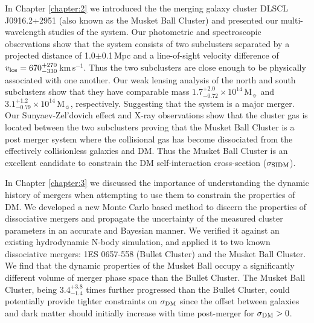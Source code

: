 In Chapter \ref{chapter:2} we introduced the the merging galaxy cluster DLSCL J0916.2+2951 (also known as the Musket Ball Cluster) and presented our multi-wavelength studies of the system.
Our photometric and spectroscopic observations show that the system consists of two subclusters separated by a projected distance of 1.0$\pm$0.1\,Mpc and a line-of-sight velocity difference of $v_{\rm los}=670^{+270}_{-330}$\,km\,s$^{-1}$.
Thus the two subclusters are close enough to be physically associated with one another.
Our weak lensing analysis of the north and south subclusters show that they have comparable mass $1.7^{+2.0}_{-0.72}\times10^{14}$\,M$_\sun$  and $3.1^{+1.2}_{-0.79}\times10^{14}$\,M$_\sun$, respectively.
Suggesting that the system is a major merger.
Our Sunyaev-Zel'dovich effect and X-ray observations show that the cluster gas is located between the two subclusters proving that the Musket Ball Cluster is a post merger system where the collisional gas has become dissociated from the effectively collisionless galaxies and DM.
Thus the Musket Ball Cluster is an excellent candidate to constrain the DM self-interaction cross-section ($\sigma_{\rm SIDM}$).

In Chapter \ref{chapter:3} we discussed the importance of understanding the dynamic history of mergers when attempting to use them to constrain the properties of DM.
We developed a new Monte Carlo based method to discern the properties of dissociative mergers and propagate the uncertainty of the measured cluster parameters in an accurate and Bayesian manner.
We verified it against an existing hydrodynamic N-body simulation, and applied it to two known dissociative mergers: 1ES 0657-558 (Bullet Cluster) and the Musket Ball Cluster.
We find that the dynamic properties of the Musket Ball occupy a significantly different volume of merger phase space than the Bullet Cluster.
The Musket Ball Cluster, being $3.4^{+3.8}_{-1.4}$ times further progressed than the Bullet Cluster, could potentially provide tighter constraints on $\sigma_{\rm DM}$ since the offset between galaxies and dark matter should initially increase with time post-merger for  $\sigma_{\rm DM}>0$.

